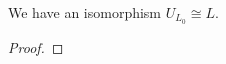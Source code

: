 \begin{remark}





\end{remark}

\begin{lemma}
  We have an isomorphism $ U_{L_0} \cong L $.
\end{lemma}
\begin{proof}
  \TODO
\end{proof}

